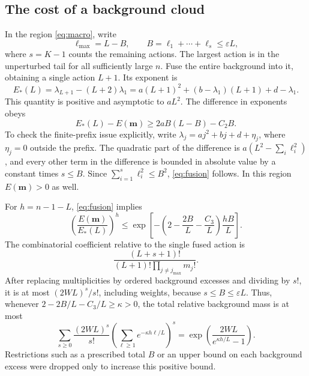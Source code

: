 \documentclass[11pt,a4paper]{article}
\numberwithin{equation}{section}
\theoremstyle{definition}\newtheorem{definition}[theorem]{Definition}
\theoremstyle{remark}\newtheorem{remark}[theorem]{Remark}
\theoremstyle{definition}
\begin{document}
\subsection{The cost of a background cloud}
In the region \eqref{eq:macro}, write
\[
 \ell_{\max}=L-B,\qquad
 B=\ell_1+\cdots+\ell_s\le\varepsilon L,
\]
where \(s=K-1\) counts the remaining actions. The largest action is in the
unperturbed tail for all sufficiently large \(n\). Fuse the entire
background into it, obtaining a single action \(L+1\). Its exponent is
\begin{equation}
 E_*(L)=\lambda_{L+1}-(L+2)\lambda_1
       =a(L+1)^2+(b-\lambda_1)(L+1)+d-\lambda_1.
 \label{eq:Estar}
\end{equation}
This quantity is positive and asymptotic to \(aL^2\). The difference in
exponents obeys
\begin{equation}
 E_*(L)-E(\bm m)\ge2aB(L-B)-C_2B.
 \label{eq:fusion}
\end{equation}
To check the finite-prefix issue explicitly, write
\(\lambda_j=aj^2+bj+d+\eta_j\), where \(\eta_j=0\) outside the prefix.
The quadratic part of the difference is
\(a(L^2-\sum_i\ell_i^2)\), and every other term in the difference is
bounded in absolute value by a constant times \(s\le B\).
Since \(\sum_{i=1}^s\ell_i^2\le B^2\), \eqref{eq:fusion} follows.
In this region \(E(\bm m)>0\) as well.

For \(h=n-1-L\), \eqref{eq:fusion} implies
\begin{equation}
 \left(\frac{E(\bm m)}{E_*(L)}\right)^h
 \le \exp\!\left[-\left(2-\frac{2B}{L}-\frac{C_3}{L}\right)
                    \frac{hB}{L}\right].
 \label{eq:cloudloss}
\end{equation}
The combinatorial coefficient relative to the single fused action is
\[
 \frac{(L+s+1)!}{(L+1)!\prod_{j\ne j_{\max}}m_j!}.
\]
After replacing multiplicities by ordered background excesses and dividing
by \(s!\), it is at most \((2WL)^s/s!\), including weights, because
\(s\le B\le\varepsilon L\). Thus, whenever
\(2-2B/L-C_3/L\ge\kappa>0\), the total relative background mass is at most
\begin{equation}
 \sum_{s\ge0}\frac{(2WL)^s}{s!}
 \left(\sum_{\ell\ge1}e^{-\kappa h\ell/L}\right)^s
 =\exp\!\left(\frac{2WL}{e^{\kappa h/L}-1}\right).
 \label{eq:cloudmajorant}
\end{equation}
Restrictions such as a prescribed total \(B\) or an upper bound on each
background excess were dropped only to increase this positive bound.
\end{document}
